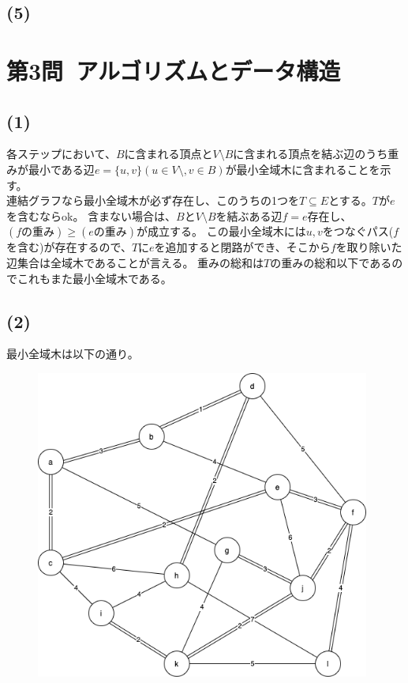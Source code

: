 \documentclass[a4paper,12pt,xelatex,ja=standard]{bxjsarticle}
\begin{document}
\subsection*{(5)}

\section*{第3問\ アルゴリズムとデータ構造}
\subsection*{(1)}
各ステップにおいて、$B$に含まれる頂点と$V \setminus B$に含まれる頂点を結ぶ辺のうち重みが最小である辺$e = \{u, v\} (u \in V \setminus, v \in B)$が最小全域木に含まれることを示す。\\
連結グラフなら最小全域木が必ず存在し、このうちの1つを$T \subseteq E$とする。$T$が$e$を含むならok。
含まない場合は、$B$と$V \setminus B$を結ぶある辺$f = e$存在し、$(f\text{の重み}) \geq (e\text{の重み})$が成立する。
この最小全域木には$u, v$をつなぐパス($f$を含む)が存在するので、$T$に$e$を追加すると閉路ができ、そこから$f$を取り除いた辺集合は全域木であることが言える。
重みの総和は$T$の重みの総和以下であるのでこれもまた最小全域木である。

\subsection*{(2)}
最小全域木は以下の通り。
\begin{figure}[H]
  \centering
  \includegraphics[width=11cm]{images/2016_min_spanning_tree.png}
\end{figure}
\end{document}
